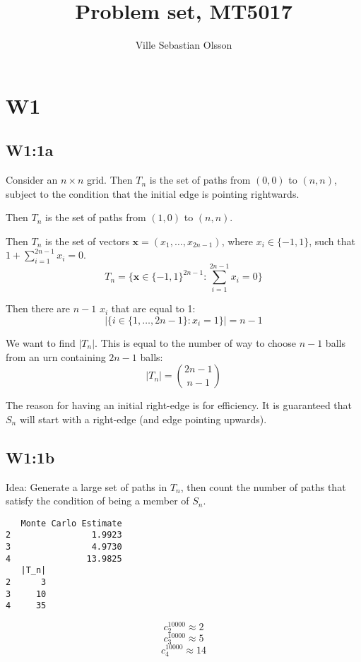 \documentclass{article}
\title{Problem set, MT5017}
\author{Ville Sebastian Olsson}
\begin{document}
\maketitle
\tableofcontents

\section{W1}

\subsection{W1:1a}

Consider an \(n\times n\) grid.
Then \(T_n\) is the set of paths from \((0,0)\) to \((n,n)\),
subject to the condition that the initial edge is pointing rightwards.

Then \(T_n\) is the set of paths from \((1,0)\) to \((n,n)\).

Then \(T_n\) is the set of vectors \(\mathbf{x} = (x_1,\ldots,x_{2n-1})\),
where \(x_i\in \{-1,1\}\),
such that \(1+\sum_{i=1}^{2n-1} x_i = 0\).
\[T_n = \{ \mathbf{x}\in \{-1,1\}^{2n-1}: \sum_{i=1}^{2n-1} x_i = 0\}\]

Then there are \(n-1\) \(x_i\) that are equal to 1:
\[|\{i \in \{1,\ldots,2n-1\}: x_i = 1\}| = n-1\]

We want to find \(|T_n|\). This is equal to the number of way to choose \(n-1\) balls
from an urn containing \(2n-1\) balls:
\[|T_n| = \binom{2n-1}{n-1}\]

The reason for having an initial right-edge is for efficiency. It is guaranteed
that \(S_n\) will start with a right-edge (and edge pointing upwards).

\subsection{W1:1b}

Idea: Generate a large set of paths in \(T_n\), then
count the number of paths that satisfy the condition of being a member of \(S_n\).

\begin{minipage}{\linewidth}
\begin{lstlisting}
   Monte Carlo Estimate
2                1.9923
3                4.9730
4               13.9825
   |T_n|
2      3
3     10
4     35
\end{lstlisting}
\end{minipage}

\[c_2^{10000} \approx 2\]
\[c_3^{10000} \approx 5\]
\[c_4^{10000} \approx 14\]
\end{document}
